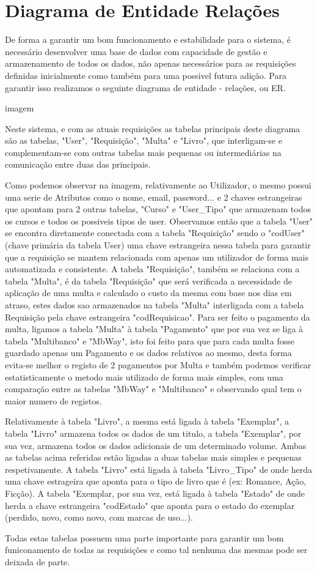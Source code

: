 \section{Diagrama de Entidade Relações}

De forma a garantir um bom funcionamento e estabilidade para o sistema, é necessário desenvolver uma base de dados com capacidade de gestão e armazenamento de todos os dados, não apenas necessários para as requisições definidas inicialmente como também para uma possivel futura adição.
Para garantir isso realizamos o seguinte diagrama de entidade - relações, ou ER.

imagem

Neste sistema, e com as atuais requisições as tabelas principais deste diagrama são as tabelas, "User", "Requisição", "Multa" e "Livro", que interligam-se e complementam-se com outras tabelas mais pequenas ou intermediárias na comunicação entre duas das principais.

Como podemos observar na imagem, relativamente ao Utilizador, o mesmo possui uma serie de Atributos como o nome, email, password... e 2 chaves estrangeiras que apontam para 2 outras tabelas, "Curso" e "User_Tipo" que armazenam todos os cursos e todos os possiveis tipos de user.
Observamos então que a tabela "User" se encontra diretamente conectada com a tabela "Requisição" sendo o "codUser" (chave primária da tabela User) uma chave estrangeira nessa tabela para garantir que a requisição se mantem relacionada com apenas um utilizador de forma mais automatizada e consistente.
A tabela "Requisição", também se relaciona com a tabela "Multa", é da tabela "Requisição" que será verificada a necessidade de aplicação de uma multa e calculado o custo da mesma com base nos dias em atraso, estes dados sao armazenados na tabela "Multa" interligada com  a tabela Requisição pela chave estrangeira "codRequisicao".
Para ser feito o pagamento da multa, ligamos a tabela "Multa" à tabela "Pagamento" que por sua vez se liga à tabela "Multibanco" e "MbWay", isto foi feito para que para cada multa fosse guardado apenas um Pagamento e os dados relativos ao mesmo, desta forma evita-se melhor o registo de 2 pagamentos por Multa e também podemos verificar estatisticamente o metodo mais utilizado de forma mais simples, com uma comparação entre as tabelas "MbWay" e "Multibanco" e observando qual tem o maior numero de registos.

Relativamente à tabela "Livro", a mesma está ligada à tabela "Exemplar", a tabela "Livro" armazena todos os dados de um titulo, a tabela "Exemplar", por sua vez, armazena todos os dados adicionais de um determinado volume.
Ambas as tabelas acima referidas estão ligadas a duas tabelas mais simples e pequenas respetivamente. A tabela "Livro" está ligada à tabela "Livro_Tipo" de onde herda uma chave estrageira que aponta para o tipo de livro que é (ex: Romance, Ação, Ficção). A tabela "Exemplar, por sua vez, está ligada à tabela "Estado" de onde herda a chave estrangeira "codEstado" que aponta para o estado do exemplar (perdido, novo, como novo, com marcas de uso...).

Todas estas tabelas possuem uma parte importante para garantir um bom funiconamento de todas as requisições e como tal nenhuma das mesmas pode ser deixada de parte.